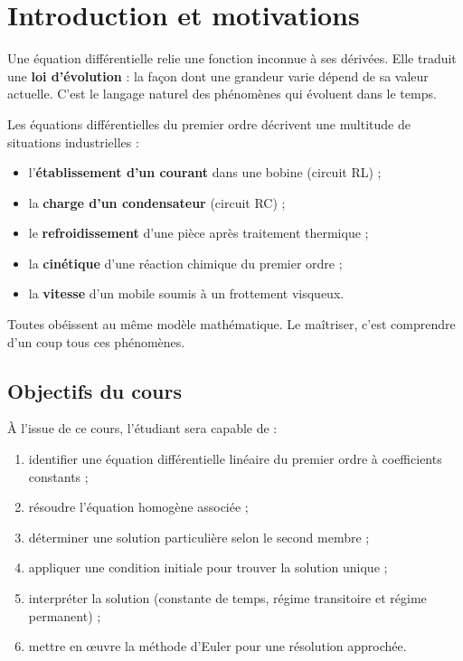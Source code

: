 \documentclass[a4paper,11pt]{article}
\begin{document}
\newpage
\tableofcontents
\newpage

\section{Introduction et motivations}

Une équation différentielle relie une fonction inconnue à ses dérivées. Elle traduit une \textbf{loi d'évolution} : la façon dont une grandeur varie dépend de sa valeur actuelle. C'est le langage naturel des phénomènes qui évoluent dans le temps.

\begin{remarque}
Les équations différentielles du premier ordre décrivent une multitude de situations industrielles :
\begin{itemize}
  \item l'\textbf{établissement d'un courant} dans une bobine (circuit RL) ;
  \item la \textbf{charge d'un condensateur} (circuit RC) ;
  \item le \textbf{refroidissement} d'une pièce après traitement thermique ;
  \item la \textbf{cinétique} d'une réaction chimique du premier ordre ;
  \item la \textbf{vitesse} d'un mobile soumis à un frottement visqueux.
\end{itemize}
Toutes obéissent au même modèle mathématique. Le maîtriser, c'est comprendre d'un coup tous ces phénomènes.
\end{remarque}

\subsection{Objectifs du cours}
À l'issue de ce cours, l'étudiant sera capable de :
\begin{enumerate}
  \item identifier une équation différentielle linéaire du premier ordre à coefficients constants ;
  \item résoudre l'équation homogène associée ;
  \item déterminer une solution particulière selon le second membre ;
  \item appliquer une condition initiale pour trouver la solution unique ;
  \item interpréter la solution (constante de temps, régime transitoire et régime permanent) ;
  \item mettre en {\oe}uvre la méthode d'Euler pour une résolution approchée.
\end{enumerate}
\end{document}
